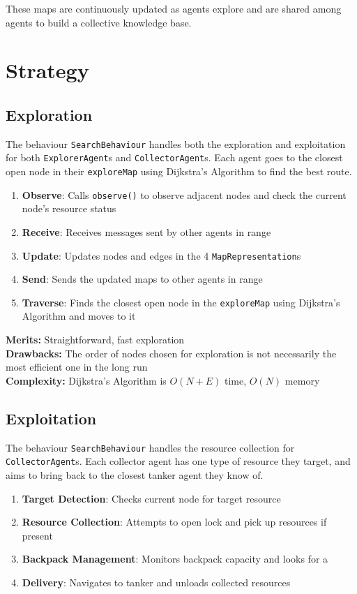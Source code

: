 \documentclass[a4paper, 12pt]{article}
\begin{document}
These maps are continuously updated as agents explore and are shared among agents to build a collective knowledge base.

\section{Strategy}

\subsection{Exploration}
The behaviour \texttt{SearchBehaviour} handles both the exploration and exploitation for both \texttt{ExplorerAgent}s and \texttt{CollectorAgent}s. Each agent goes to the closest open node in their \texttt{exploreMap} using Dijkstra's Algorithm to find the best route.
\begin{enumerate}
  \item \textbf{Observe}: Calls \texttt{observe()} to observe adjacent nodes and check the current node's resource status
  \item \textbf{Receive}: Receives messages sent by other agents in range
  \item \textbf{Update}: Updates nodes and edges in the 4 \texttt{MapRepresentation}s
  \item \textbf{Send}: Sends the updated maps to other agents in range
  \item \textbf{Traverse}: Finds the closest open node in the \texttt{exploreMap} using Dijkstra's Algorithm and moves to it
\end{enumerate}

\textbf{Merits:} Straightforward, fast exploration\\
\textbf{Drawbacks:} The order of nodes chosen for exploration is not necessarily the most efficient one in the long run\\
\textbf{Complexity:} Dijkstra's Algorithm is $O(N+E)$ time, $O(N)$ memory

\subsection{Exploitation}
The behaviour \texttt{SearchBehaviour} handles the resource collection for \texttt{CollectorAgent}s. Each collector agent has one type of resource they target, and aims to bring back to the closest tanker agent they know of.
\begin{enumerate}
  \item \textbf{Target Detection}: Checks current node for target resource
  \item \textbf{Resource Collection}: Attempts to open lock and pick up resources if present
  \item \textbf{Backpack Management}: Monitors backpack capacity and looks for a 
  \item \textbf{Delivery}: Navigates to tanker and unloads collected resources
\end{enumerate}
\end{document}
